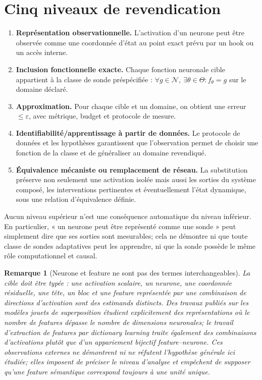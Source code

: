 \documentclass[11pt,a4paper,oneside]{report}
\newtheorem{remark}{Remarque}[chapter]
\begin{document}
\section{Cinq niveaux de revendication}
\begin{enumerate}
\item \textbf{Représentation observationnelle.} L'activation d'un neurone peut être observée comme une coordonnée d'état au point exact prévu par un hook ou un accès interne.
\item \textbf{Inclusion fonctionnelle exacte.} Chaque fonction neuronale cible appartient à la classe de sonde préspécifiée : \(\forall g\in\mathcal N,\ \exists\theta\in\Theta:f_\theta=g\) sur le domaine déclaré.
\item \textbf{Approximation.} Pour chaque cible et un domaine, on obtient une erreur \(\leq\varepsilon\), avec métrique, budget et protocole de mesure.
\item \textbf{Identifiabilité/apprentissage à partir de données.} Le protocole de données et les hypothèses garantissent que l'observation permet de choisir une fonction de la classe et de généraliser au domaine revendiqué.
\item \textbf{Équivalence mécaniste ou remplacement de réseau.} La substitution préserve non seulement une activation isolée mais aussi les sorties du système composé, les interventions pertinentes et éventuellement l'état dynamique, sous une relation d'équivalence définie.
\end{enumerate}

Aucun niveau supérieur n'est une conséquence automatique du niveau inférieur. En particulier, « un neurone peut être représenté comme une sonde » peut simplement dire que ses sorties sont mesurables; cela ne démontre ni que toute classe de sondes adaptatives peut les apprendre, ni que la sonde possède le même rôle computationnel et causal.

\begin{remark}[Neurone et feature ne sont pas des termes interchangeables]
La cible doit être typée : une activation scalaire, un neurone, une coordonnée résiduelle, une tête, un bloc et une feature représentée par une combinaison de directions d'activation sont des estimands distincts. Des travaux publiés sur les modèles jouets de superposition étudient explicitement des représentations où le nombre de features dépasse le nombre de dimensions neuronales; le travail d'extraction de features par dictionary learning traite également des combinaisons d'activations plutôt que d'un appariement bijectif feature--neurone. Ces observations externes ne démontrent ni ne réfutent l'hypothèse générale ici étudiée; elles imposent de préciser le niveau d'analyse et empêchent de supposer qu'une feature sémantique correspond toujours à une unité unique.\end{remark}
\end{document}
